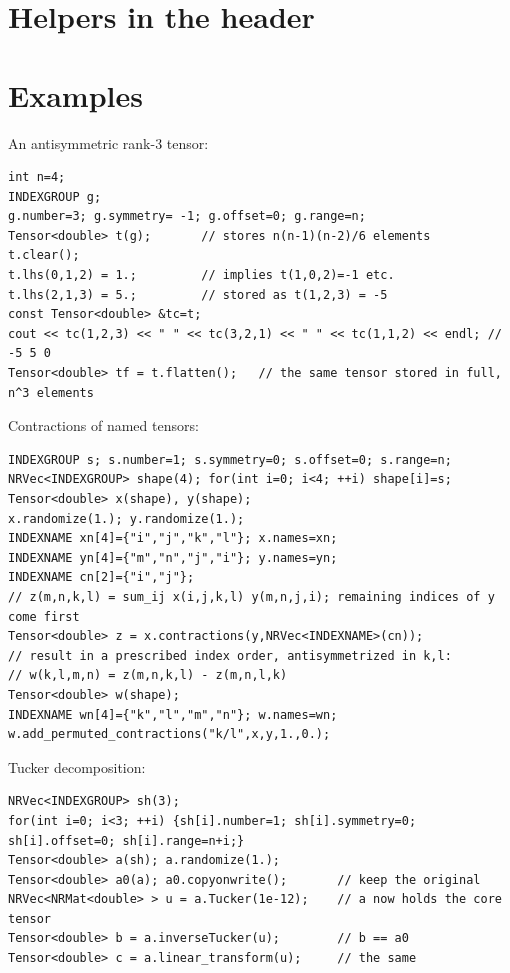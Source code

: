 \section{Helpers in the header}

\begin{lareference}
\end{lareference}

\section{Examples}\label{sec:tensor:examples}

An antisymmetric rank-3 tensor:
\begin{lstlisting}
int n=4;
INDEXGROUP g;
g.number=3; g.symmetry= -1; g.offset=0; g.range=n;
Tensor<double> t(g);       // stores n(n-1)(n-2)/6 elements
t.clear();
t.lhs(0,1,2) = 1.;         // implies t(1,0,2)=-1 etc.
t.lhs(2,1,3) = 5.;         // stored as t(1,2,3) = -5
const Tensor<double> &tc=t;
cout << tc(1,2,3) << " " << tc(3,2,1) << " " << tc(1,1,2) << endl; // -5 5 0
Tensor<double> tf = t.flatten();   // the same tensor stored in full, n^3 elements
\end{lstlisting}

Contractions of named tensors:
\begin{lstlisting}
INDEXGROUP s; s.number=1; s.symmetry=0; s.offset=0; s.range=n;
NRVec<INDEXGROUP> shape(4); for(int i=0; i<4; ++i) shape[i]=s;
Tensor<double> x(shape), y(shape);
x.randomize(1.); y.randomize(1.);
INDEXNAME xn[4]={"i","j","k","l"}; x.names=xn;
INDEXNAME yn[4]={"m","n","j","i"}; y.names=yn;
INDEXNAME cn[2]={"i","j"};
// z(m,n,k,l) = sum_ij x(i,j,k,l) y(m,n,j,i); remaining indices of y come first
Tensor<double> z = x.contractions(y,NRVec<INDEXNAME>(cn));
// result in a prescribed index order, antisymmetrized in k,l:
// w(k,l,m,n) = z(m,n,k,l) - z(m,n,l,k)
Tensor<double> w(shape);
INDEXNAME wn[4]={"k","l","m","n"}; w.names=wn;
w.add_permuted_contractions("k/l",x,y,1.,0.);
\end{lstlisting}

Tucker decomposition:
\begin{lstlisting}
NRVec<INDEXGROUP> sh(3);
for(int i=0; i<3; ++i) {sh[i].number=1; sh[i].symmetry=0; sh[i].offset=0; sh[i].range=n+i;}
Tensor<double> a(sh); a.randomize(1.);
Tensor<double> a0(a); a0.copyonwrite();       // keep the original
NRVec<NRMat<double> > u = a.Tucker(1e-12);    // a now holds the core tensor
Tensor<double> b = a.inverseTucker(u);        // b == a0
Tensor<double> c = a.linear_transform(u);     // the same
\end{lstlisting}

